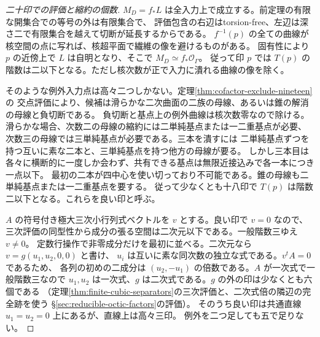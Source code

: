 \begin{proof}[二十印での評価と縮約の個数]
$M_D=f_*L$ は全入力上で成立する。前定理の有限な開集合での等号の外は有限集合で、
評価包含の右辺はtorsion-free、左辺は深さ二で有限集合を越えて切断が延長するからである。
$f^{-1}(p)$ の全ての曲線が核空間の点に写れば、核超平面で繊維の像を避けるものがある。
固有性により $p$ の近傍上で $L$ は自明となり、そこで $M_D\simeq f_*\mathcal O_\Gamma$。
従って印 $p$ では $T(p)$ の階数は二以下となる。ただし核次数が正で入力に潰れる曲線の像を除く。

そのような例外入力点は高々二つしかない。定理\ref{thm:cofactor-exclude-nineteen}の
交点評価により、候補は滑らかな二次曲面の二族の母線、あるいは錐の解消の母線と負切断である。
負切断と基点上の例外曲線は核次数零なので除ける。
滑らかな場合、次数二の母線の縮約には二単純基点または一二重基点が必要、
次数三の母線では三単純基点が必要である。三本を潰すには
二単純基点ずつを持つ互いに素な二本と、三単純基点を持つ他方の母線が要る。
しかし三本目は各々に横断的に一度しか会わず、共有できる基点は無限近接込みで各一本につき一点以下。
最初の二本が四中心を使い切っており不可能である。錐の母線も二単純基点または一二重基点を要する。
従って少なくとも十八印で $T(p)$ は階数二以下となる。これらを良い印と呼ぶ。

$A$ の符号付き極大三次小行列式ベクトルを $v$ とする。良い印で $v=0$ なので、
三次評価の同型性から成分の張る空間は二次元以下である。一般階数三ゆえ $v\ne0$。
定数行操作で非零成分だけを最初に並べる。二次元なら $v=g(u_1,u_2,0,0)$ と書け、
$u_i$ は互いに素な同次数の独立な式である。$v^t A=0$ であるため、
各列の初めの二成分は $(u_2,-u_1)$ の倍数である。$A$ が一次式で一般階数三なので
$u_1,u_2$ は一次式、$g$ は二次式である。$g$ の外の印は少なくとも六個である
（定理\ref{thm:finite-cubic-separators}の三次評価と、二次式倍の隣辺の完全跡を使う
\S\ref{sec:reducible-octic-factors}の評価）。
そのうち良い印は共通直線 $u_1=u_2=0$ 上にあるが、直線上は高々三印。
例外を二つ足しても五で足りない。
\end{proof}

